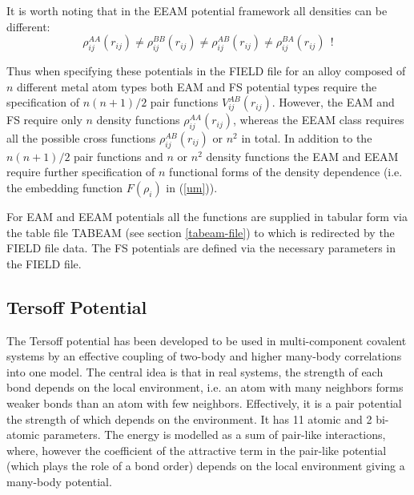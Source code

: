 It is worth noting that in the EEAM potential framework all densities
can be different:
\begin{equation}
\rho^{AA}_{ij}(r_{ij}) \neq \rho^{BB}_{ij}(r_{ij}) \neq \rho^{AB}_{ij}(r_{ij}) \neq
\rho^{BA}_{ij}(r_{ij})~~!
\end{equation}

Thus when specifying these potentials in the \D FIELD file for
an alloy composed of $n$ different metal atom types both EAM and FS
potential types require the specification of $n(n+1)/2$ pair functions
$V^{AB}_{ij}(r_{ij})$.  However, the EAM and FS require only $n$ density
functions $\rho^{AA}_{ij}(r_{ij})$, whereas the EEAM class requires all
the possible cross functions $\rho^{AB}_{ij}(r_{ij})$ or $n^2$ in total.
In addition to the $n(n+1)/2$ pair functions and $n$ or $n^2$ density
functions the EAM and EEAM require further specification of $n$
functional forms of the density dependence (i.e. the embedding function
$F(\rho_{i})$ in (\ref{um})).

For EAM and EEAM potentials all the functions are supplied in tabular
form via the table file TABEAM (see section \ref{tabeam-file}) to which
\D is redirected by the FIELD file data.  The FS potentials are defined
via the necessary parameters in the FIELD file.

\subsection{Tersoff Potential}
\label{tersoff}

The Tersoff \cite{tersoff-89a} potential
has been developed to be used in multi-component covalent systems by
an effective coupling of two-body and higher many-body correlations
into one model.  The central idea is that in real systems, the
strength of each bond depends on the local environment, i.e. an atom
with many neighbors forms weaker bonds than an atom with few
neighbors.  Effectively, it is a pair potential the strength of
which depends on the environment.  It has 11 atomic and 2 bi-atomic
parameters.  The energy is modelled as a sum of pair-like
interactions, where, however the coefficient of the attractive term
in the pair-like potential (which plays the role of a bond order)
depends on the local environment giving a many-body potential.

